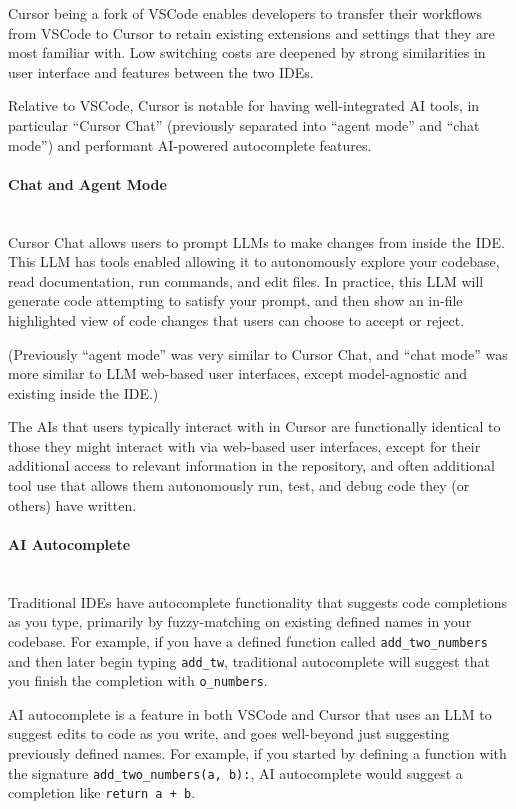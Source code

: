\documentclass{article}
\newcommand{\inlinecode}[1]{\colorbox{codegray}{\texttt{#1}}}
\renewcommand{\subsubsubsection}[1]{\paragraph{#1}~\\}
\begin{document}
Cursor being a fork of VSCode enables developers to transfer their workflows from VSCode to Cursor to retain existing extensions and settings that they are most familiar with. Low switching costs are deepened by strong similarities in user interface and features between the two IDEs.

Relative to VSCode, Cursor is notable for having well-integrated AI tools, in particular ``Cursor Chat'' (previously separated into ``agent mode'' and ``chat mode'') and performant AI-powered autocomplete features.

\subsubsubsection{Chat and Agent Mode}

Cursor Chat allows users to prompt LLMs to make changes from inside the IDE. This LLM has tools enabled allowing it to autonomously explore your codebase, read documentation, run commands, and edit files. In practice, this LLM will generate code attempting to satisfy your prompt, and then show an in-file highlighted view of code changes that users can choose to accept or reject. 

(Previously ``agent mode'' was very similar to Cursor Chat, and ``chat mode'' was more similar to LLM web-based user interfaces, except model-agnostic and existing inside the IDE.)

The AIs that users typically interact with in Cursor are functionally identical to those they might interact with via web-based user interfaces, except for their additional access to relevant information in the repository, and often additional tool use that allows them autonomously run, test, and debug code they (or others) have written.

\subsubsubsection{AI Autocomplete}

Traditional IDEs have autocomplete functionality that suggests code completions as you type, primarily by fuzzy-matching on existing defined names in your codebase. For example, if you have a defined function called \inlinecode{add\_two\_numbers} and then later begin typing \inlinecode{add\_tw}, traditional autocomplete will suggest that you finish the completion with \inlinecode{o\_numbers}.

AI autocomplete is a feature in both VSCode and Cursor that uses an LLM to suggest edits to code as you write, and goes well-beyond just suggesting previously defined names. For example, if you started by defining a function with the signature \inlinecode{add\_two\_numbers(a,\ b):}, AI autocomplete would suggest a completion like \inlinecode{return\ a\ +\ b}.
\end{document}

